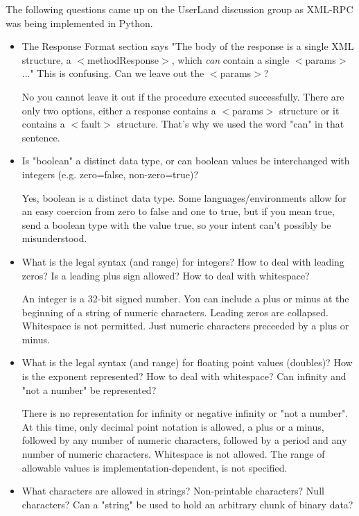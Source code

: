 The following questions came up on the UserLand discussion group as XML-RPC was being implemented in Python.
\begin{itemize}
\item The Response Format section says "The body of the response is a single XML structure, a $<$methodResponse$>$, which \emph{ can}
contain a single $<$params$>$..." This is confusing. Can we leave out the $<$params$>$? 

No you cannot leave it out if the procedure executed successfully. There are only two options, either a response contains a $<$params$>$ structure or it contains a $<$fault$>$ structure. That's why we used the word "can" in that sentence.

\item Is "boolean" a distinct data type, or can boolean values be interchanged with integers (e.g. zero=false, non-zero=true)? 

Yes, boolean is a distinct data type. Some languages/environments allow for an easy coercion from zero to false and one to true, but if you mean true, send a boolean type with the value true, so your intent can't possibly be misunderstood.

\item What is the legal syntax (and range) for integers? How to deal with leading zeros? Is a leading plus sign allowed? How to deal with whitespace? 

An integer is a 32-bit signed number. You can include a plus or minus at the beginning of a string of numeric characters. Leading zeros are collapsed. Whitespace is not permitted. Just numeric characters preceeded by a plus or minus.

\item What is the legal syntax (and range) for floating point values (doubles)? How is the exponent represented? How to deal with whitespace? Can infinity and "not a number" be represented? 

There is no representation for infinity or negative infinity or "not a number". At this time, only decimal point notation is allowed, a plus or a minus, followed by any number of numeric characters, followed by a period and any number of numeric characters. Whitespace is not allowed. The range of allowable values is implementation-dependent, is not specified.

\item What characters are allowed in strings? Non-printable characters? Null characters? Can a "string" be used to hold an arbitrary chunk of binary data? 


\end{itemize}
